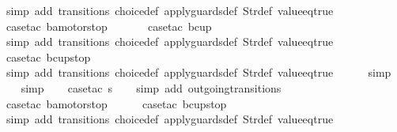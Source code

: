\begin{isabellebody}
\ {\isacharparenleft}simp\ add{\isacharcolon}\ transitions\ choice{\isacharunderscore}def\ apply{\isacharunderscore}guards{\isacharunderscore}def\ Str{\isacharunderscore}def\ value{\isacharunderscore}eq{\isacharunderscore}true{\isacharparenright}\isanewline
\ \ \ \isamarkupfalse%
\ {\isacharparenleft}case{\isacharunderscore}tac\ {\isachardoublequoteopen}ba{\isacharequal}motorstop\ {}{\isachardoublequoteclose}{\isacharparenright}\isanewline
\ \ \ \ \isamarkupfalse%
\ {\isacharparenleft}case{\isacharunderscore}tac\ {\isachardoublequoteopen}bc{\isacharequal}up{}{}{\isachardoublequoteclose}{\isacharparenright}\isanewline
\ \ \ \ \ \isamarkupfalse%
\ {\isacharparenleft}simp\ add{\isacharcolon}\ transitions\ choice{\isacharunderscore}def\ apply{\isacharunderscore}guards{\isacharunderscore}def\ Str{\isacharunderscore}def\ value{\isacharunderscore}eq{\isacharunderscore}true{\isacharparenright}\isanewline
\ \ \ \ \isamarkupfalse%
\ {\isacharparenleft}case{\isacharunderscore}tac\ {\isachardoublequoteopen}bc{\isacharequal}up{}{}stop{\isachardoublequoteclose}{\isacharparenright}\isanewline
\ \ \ \ \ \isamarkupfalse%
\ {\isacharparenleft}simp\ add{\isacharcolon}\ transitions\ choice{\isacharunderscore}def\ apply{\isacharunderscore}guards{\isacharunderscore}def\ Str{\isacharunderscore}def\ value{\isacharunderscore}eq{\isacharunderscore}true{\isacharparenright}\isanewline
\ \ \ \ \isamarkupfalse%
\ simp\isanewline
\ \ \isamarkupfalse%
\ simp\isanewline
\ \ \isamarkupfalse%
\ {\isacharparenleft}case{\isacharunderscore}tac\ {\isachardoublequoteopen}s{\isacharequal}{}{\isachardoublequoteclose}{\isacharparenright}\isanewline
\ \ \isamarkupfalse%
\ {\isacharparenleft}simp\ add{\isacharcolon}\ outgoing{\isacharunderscore}transitions{\isacharunderscore}{}{\isacharparenright}\isanewline
\ \ \ \isamarkupfalse%
\ {\isacharparenleft}case{\isacharunderscore}tac\ {\isachardoublequoteopen}ba{\isacharequal}motorstop{}{\isachardoublequoteclose}{\isacharparenright}\isanewline
\ \ \ \ \isamarkupfalse%
\ {\isacharparenleft}case{\isacharunderscore}tac\ {\isachardoublequoteopen}bc{\isacharequal}up{}{}stop{\isachardoublequoteclose}{\isacharparenright}\isanewline
\ \ \ \ \ \isamarkupfalse%
\ {\isacharparenleft}simp\ add{\isacharcolon}\ transitions\ choice{\isacharunderscore}def\ apply{\isacharunderscore}guards{\isacharunderscore}def\ Str{\isacharunderscore}def\ value{\isacharunderscore}eq{\isacharunderscore}true{\isacharparenright}\isanewline

\end{isabellebody}
